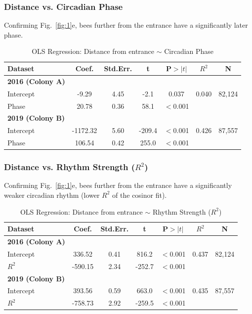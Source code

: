 \documentclass{article}
\begin{document}
{\subsubsection*{Distance vs. Circadian Phase}
Confirming Fig.~\ref{fig:1}e, bees further from the entrance have a significantly later phase.

\begin{table}[h]
\centering
\caption{OLS Regression: Distance from entrance $\sim$ Circadian Phase}
\label{tab:dist_phase}
\begin{tabular}{lcccccc}
\toprule
Dataset & Coef. & Std.Err. & t & P$>|t|$ & $R^2$ & N \\
\midrule
\textbf{2016 (Colony A)} & & & & & & \\
Intercept & -9.29 & 4.45 & -2.1 & 0.037 & 0.040 & 82,124 \\
Phase & 20.78 & 0.36 & 58.1 & $<$0.001 & & \\
\midrule
\textbf{2019 (Colony B)} & & & & & & \\
Intercept & -1172.32 & 5.60 & -209.4 & $<$0.001 & 0.426 & 87,557 \\
Phase & 106.54 & 0.42 & 255.0 & $<$0.001 & & \\
\bottomrule
\end{tabular}
\end{table}

\subsubsection*{Distance vs. Rhythm Strength ($R^2$)}
Confirming Fig.~\ref{fig:1}e, bees further from the entrance have a significantly weaker circadian rhythm (lower $R^2$ of the cosinor fit).

\begin{table}[h]
\centering
\caption{OLS Regression: Distance from entrance $\sim$ Rhythm Strength ($R^2$)}
\label{tab:dist_r2}
\begin{tabular}{lcccccc}
\toprule
Dataset & Coef. & Std.Err. & t & P$>|t|$ & $R^2$ & N \\
\midrule
\textbf{2016 (Colony A)} & & & & & & \\
Intercept & 336.52 & 0.41 & 816.2 & $<$0.001 & 0.437 & 82,124 \\
$R^2$ & -590.15 & 2.34 & -252.7 & $<$0.001 & & \\
\midrule
\textbf{2019 (Colony B)} & & & & & & \\
Intercept & 393.56 & 0.59 & 663.0 & $<$0.001 & 0.435 & 87,557 \\
$R^2$ & -758.73 & 2.92 & -259.5 & $<$0.001 & & \\
\bottomrule
\end{tabular}
\end{table}

}
\end{document}
